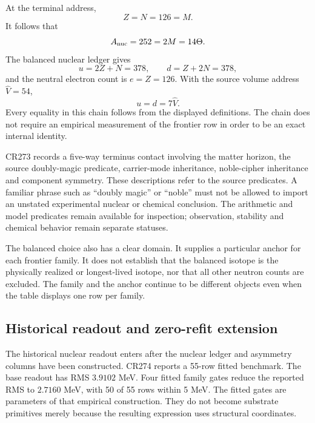 At the terminal address,
\begin{equation}
Z=N=126=M.
\end{equation}
It follows that
\begin{equation}
A_{\rm nuc}=252=2M=14\Theta.
\end{equation}
The balanced nuclear ledger gives
\begin{equation}
u=2Z+N=378,\qquad d=Z+2N=378,
\end{equation}
and the neutral electron count is $e=Z=126$. With the source volume address $\hat V=54$,
\begin{equation}
u=d=7\hat V.
\end{equation}
Every equality in this chain follows from the displayed definitions. The chain does not require an empirical measurement of the frontier row in order to be an exact internal identity.

CR273 records a five-way terminus contact involving the matter horizon, the source doubly-magic predicate, carrier-mode inheritance, noble-cipher inheritance and component symmetry. These descriptions refer to the source predicates. A familiar phrase such as ``doubly magic'' or ``noble'' must not be allowed to import an unstated experimental nuclear or chemical conclusion. The arithmetic and model predicates remain available for inspection; observation, stability and chemical behavior remain separate statuses.

The balanced choice also has a clear domain. It supplies a particular anchor for each frontier family. It does not establish that the balanced isotope is the physically realized or longest-lived isotope, nor that all other neutron counts are excluded. The family and the anchor continue to be different objects even when the table displays one row per family.

\subsection{Historical readout and zero-refit extension}

The historical nuclear readout enters after the nuclear ledger and asymmetry columns have been constructed. CR274 reports a 55-row fitted benchmark. The base readout has RMS $3.9102$ MeV. Four fitted family gates reduce the reported RMS to $2.7160$ MeV, with 50 of 55 rows within 5 MeV. The fitted gates are parameters of that empirical construction. They do not become substrate primitives merely because the resulting expression uses structural coordinates.\cite{viireview}

